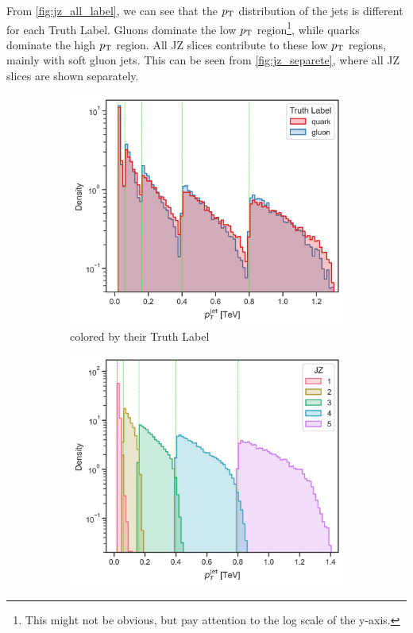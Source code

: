 From \cref{fig:jz_all_label}, we can see that the $p_\text{T}$ distribution of the jets is different for each Truth Label.
Gluons dominate the low $p_\text{T}$ region\footnote{This might not be obvious, but pay attention to the log scale of the y-axis.}, while quarks dominate the high $p_\text{T}$ region.
All JZ slices contribute to these low $p_\text{T}$ regions, mainly with soft gluon jets.
This can be seen from \cref{fig:jz_separete}, where all JZ slices are shown separately.
\begin{figure}[htb]
    \centering
    \begin{subfigure}[t]{0.49\textwidth}
        \centering
        \includegraphics[width=\linewidth]{src/plots/pt_jet_label_cut.jpg}
        \caption{colored by their Truth Label}
        \label{fig:jz_all_cut_label}
    \end{subfigure}
    \begin{subfigure}[t]{0.49\textwidth}
        \centering
        \includegraphics[width=\linewidth]{src/plots/pt_jet_jz_cut.jpg}

\end{subfigure}
\end{figure}
